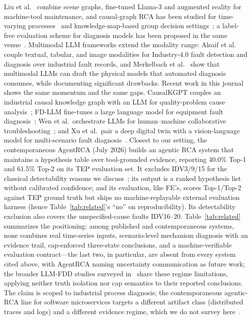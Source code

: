 \documentclass[preprint,10pt]{elsarticle}
\begin{document}
Liu et al.~\cite{liu2025probing} combine scene graphs, fine-tuned Llama-3 and augmented reality for machine-tool maintenance, and causal-graph RCA has been studied for time-varying processes~\cite{liu2025spatial} and knowledge-map-based group decision settings~\cite{yue2023root}; a label-free evaluation scheme for diagnosis models has been proposed in the same venue~\cite{liu2024label}. Multimodal LLM frameworks extend the modality range: Alsaif et al.~\cite{alsaif2024multimodal} couple textual, tabular, and image modalities for Industry-4.0 fault detection and diagnosis over industrial fault records, and Merkelbach et al.~\cite{merkelbach2024multimodal} show that multimodal LLMs can draft the physical models that automated diagnosis consumes, while documenting significant drawbacks.
Recent work in this journal shows the same momentum and the same gaps.  CausalKGPT couples an industrial causal knowledge graph with an LLM for quality-problem cause analysis~\cite{zhou2024causalkgpt}; FD-LLM fine-tunes a large language model for equipment fault diagnosis~\cite{lin2025fdllm}; Wen et al.\ orchestrate LLMs for human--machine collaborative troubleshooting~\cite{wen2025troubleshooting}; and Xu et al.\ pair a deep digital twin with a vision-language model for multi-scenario fault diagnosis~\cite{xu2026digitaltwin}. Closest to our setting, the contemporaneous AgentRCA (July 2026) builds an agentic RCA system that maintains a hypothesis table over tool-grounded evidence, reporting 40.0\% Top-1 and 61.5\% Top-2 on its TEP evaluation set. It excludes IDV3/9/15 for the classical detectability reasons we discuss~\cite{wei2026agentrca}; its output is a ranked hypothesis list without calibrated confidence; and its evaluation, like FE's, scores Top-1/Top-2 against TEP ground truth but ships no machine-replayable external evaluation harness (hence Table~\ref{tab:related}'s ``no'' on reproducibility). Its detectability exclusion also covers the unspecified-cause faults IDV16--20. Table~\ref{tab:related} summarizes the positioning: among published and contemporaneous systems, none combines real time-series inputs, scenario-level mechanism diagnosis with an evidence trail, cap-enforced three-state conclusions, and a machine-verifiable evaluation contract---the last two, in particular, are absent from every system cited above, with AgentRCA naming uncertainty communication as future work; the broader LLM-FDD studies surveyed in~\cite{agentic2026review} share these regime limitations, applying neither truth isolation nor cap semantics to their reported conclusions. The claim is scoped to industrial process diagnosis; the contemporaneous agentic-RCA line for software microservices targets a different artifact class (distributed traces and logs) and a different evidence regime, which we do not survey here~\cite{chen2023automatic}.
\end{document}
